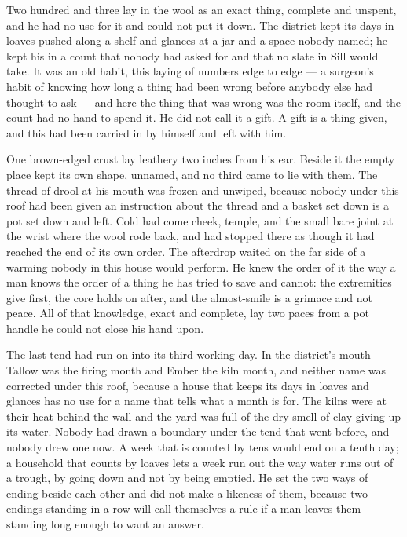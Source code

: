 Two hundred and three lay in the wool as an exact thing, complete and unspent, and he had no use for it and could not put it down. The district kept its days in loaves pushed along a shelf and glances at a jar and a space nobody named; he kept his in a count that nobody had asked for and that no slate in Sill would take. It was an old habit, this laying of numbers edge to edge --- a surgeon's habit of knowing how long a thing had been wrong before anybody else had thought to ask --- and here the thing that was wrong was the room itself, and the count had no hand to spend it. He did not call it a gift. A gift is a thing given, and this had been carried in by himself and left with him.

One brown-edged crust lay leathery two inches from his ear. Beside it the empty place kept its own shape, unnamed, and no third came to lie with them. The thread of drool at his mouth was frozen and unwiped, because nobody under this roof had been given an instruction about the thread and a basket set down is a pot set down and left. Cold had come cheek, temple, and the small bare joint at the wrist where the wool rode back, and had stopped there as though it had reached the end of its own order. The afterdrop waited on the far side of a warming nobody in this house would perform. He knew the order of it the way a man knows the order of a thing he has tried to save and cannot: the extremities give first, the core holds on after, and the almost-smile is a grimace and not peace. All of that knowledge, exact and complete, lay two paces from a pot handle he could not close his hand upon.

The last tend had run on into its third working day. In the district's mouth Tallow was the firing month and Ember the kiln month, and neither name was corrected under this roof, because a house that keeps its days in loaves and glances has no use for a name that tells what a month is for. The kilns were at their heat behind the wall and the yard was full of the dry smell of clay giving up its water. Nobody had drawn a boundary under the tend that went before, and nobody drew one now. A week that is counted by tens would end on a tenth day; a household that counts by loaves lets a week run out the way water runs out of a trough, by going down and not by being emptied. He set the two ways of ending beside each other and did not make a likeness of them, because two endings standing in a row will call themselves a rule if a man leaves them standing long enough to want an answer.

